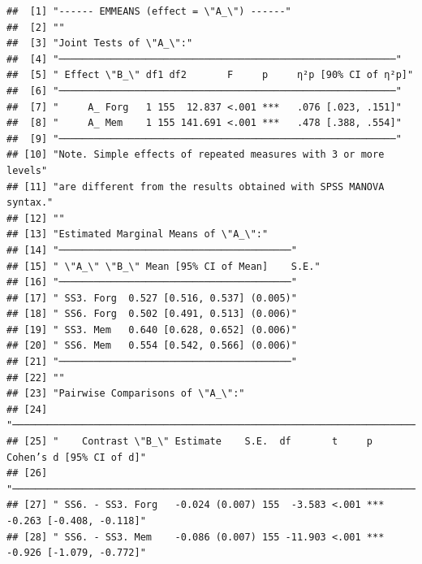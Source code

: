 \documentclass[
  man]{apa6}
\begin{document}
\begin{verbatim}
##  [1] "------ EMMEANS (effect = \"A_\") ------"                                           
##  [2] ""                                                                                  
##  [3] "Joint Tests of \"A_\":"                                                            
##  [4] "──────────────────────────────────────────────────────────"                        
##  [5] " Effect \"B_\" df1 df2       F     p     η²p [90% CI of η²p]"                      
##  [6] "──────────────────────────────────────────────────────────"                        
##  [7] "     A_ Forg   1 155  12.837 <.001 ***   .076 [.023, .151]"                        
##  [8] "     A_ Mem    1 155 141.691 <.001 ***   .478 [.388, .554]"                        
##  [9] "──────────────────────────────────────────────────────────"                        
## [10] "Note. Simple effects of repeated measures with 3 or more levels"                   
## [11] "are different from the results obtained with SPSS MANOVA syntax."                  
## [12] ""                                                                                  
## [13] "Estimated Marginal Means of \"A_\":"                                               
## [14] "────────────────────────────────────────"                                          
## [15] " \"A_\" \"B_\" Mean [95% CI of Mean]    S.E."                                      
## [16] "────────────────────────────────────────"                                          
## [17] " SS3. Forg  0.527 [0.516, 0.537] (0.005)"                                          
## [18] " SS6. Forg  0.502 [0.491, 0.513] (0.006)"                                          
## [19] " SS3. Mem   0.640 [0.628, 0.652] (0.006)"                                          
## [20] " SS6. Mem   0.554 [0.542, 0.566] (0.006)"                                          
## [21] "────────────────────────────────────────"                                          
## [22] ""                                                                                  
## [23] "Pairwise Comparisons of \"A_\":"                                                   
## [24] "────────────────────────────────────────────────────────────────────────────────"  
## [25] "    Contrast \"B_\" Estimate    S.E.  df       t     p     Cohen’s d [95% CI of d]"
## [26] "────────────────────────────────────────────────────────────────────────────────"  
## [27] " SS6. - SS3. Forg   -0.024 (0.007) 155  -3.583 <.001 *** -0.263 [-0.408, -0.118]"  
## [28] " SS6. - SS3. Mem    -0.086 (0.007) 155 -11.903 <.001 *** -0.926 [-1.079, -0.772]"  

\end{verbatim}
\end{document}
